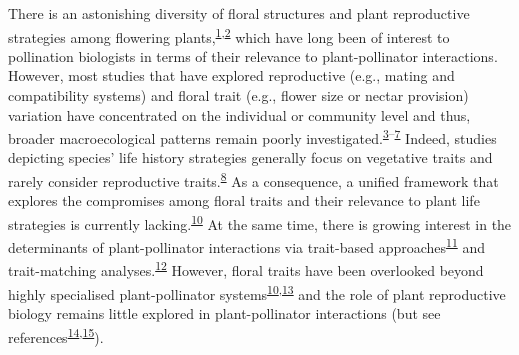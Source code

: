 \documentclass[
  12pt,
  a4paper,
]{article}
\begin{document}
\doublespacing
\vspace{5mm}
\normalsize

There is an astonishing diversity of floral structures and plant reproductive strategies among flowering plants,\textsuperscript{\protect\hyperlink{ref-barrett2002}{1},\protect\hyperlink{ref-schiestl2013}{2}} which have long been of interest to pollination biologists in terms of their relevance to plant-pollinator interactions. However, most studies that have explored reproductive (e.g., mating and compatibility systems) and floral trait (e.g., flower size or nectar provision) variation have concentrated on the individual or community level and thus, broader macroecological patterns remain poorly investigated.\textsuperscript{\protect\hyperlink{ref-carvalheiro2014}{3}--\protect\hyperlink{ref-grossenbacher2017}{7}} Indeed, studies depicting species' life history strategies generally focus on vegetative traits and rarely consider reproductive traits.\textsuperscript{\protect\hyperlink{ref-salguero2016}{8}} As a consequence, a unified framework that explores the compromises among floral traits and their relevance to plant life strategies is currently lacking.\textsuperscript{\protect\hyperlink{ref-roddy2021}{10}} At the same time, there is growing interest in the determinants of plant-pollinator interactions via trait-based approaches\textsuperscript{\protect\hyperlink{ref-fenster2004}{11}} and trait-matching analyses.\textsuperscript{\protect\hyperlink{ref-bartomeus2016}{12}} However, floral traits have been overlooked beyond highly specialised plant-pollinator systems\textsuperscript{\protect\hyperlink{ref-roddy2021}{10},\protect\hyperlink{ref-dellinger2020}{13}} and the role of plant reproductive biology remains little explored in plant-pollinator interactions (but see references\textsuperscript{\protect\hyperlink{ref-tur2013}{14},\protect\hyperlink{ref-devaux2014}{15}}).
\end{document}
